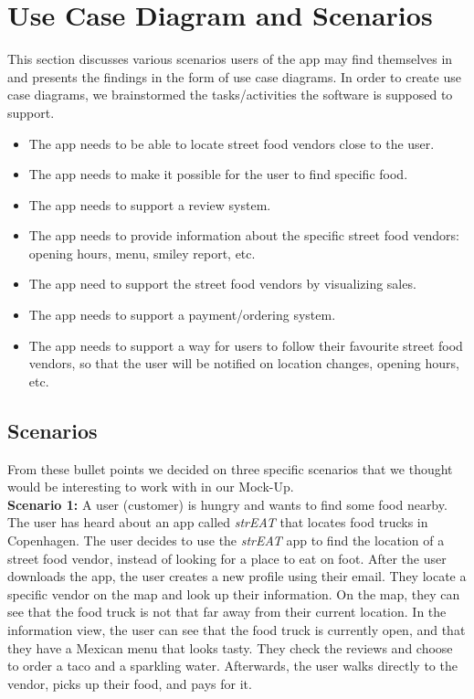 \section{Use Case Diagram and Scenarios}

This section discusses various scenarios users of the app may find themselves in and presents the findings in the form of use case diagrams. In order to create use case diagrams, we brainstormed the tasks/activities the software is supposed to support.

\begin{itemize}
\item The app needs to be able to locate street food vendors close to the user.
\item The app needs to make it possible for the user to find specific food.
\item The app needs to support a review system.
\item The app needs to provide information about the specific street food vendors: opening hours, menu, smiley report, etc.
\item The app need to support the street food vendors by visualizing sales.
\item The app needs to support a payment/ordering system.
\item The app needs to support a way for users to follow their favourite street food vendors, so that the user will be notified on location changes, opening hours, etc.
\end{itemize}


\subsection{Scenarios}
From these bullet points we decided on three specific scenarios that we thought would be interesting to work with in our Mock-Up.\\

\textbf{Scenario 1:}
A user (customer) is hungry and wants to find some food nearby. The user has heard about an app called \textit{strEAT} that locates food trucks in Copenhagen. The user decides to use the \textit{strEAT} app to find the location of a street food vendor, instead of looking for a place to eat on foot. After the user downloads the app, the user creates a new profile using their email. They locate a specific vendor on the map and look up their information. On the map, they can see that the food truck is not that far away from their current location. In the information view, the user can see that the food truck is currently open, and that they have a Mexican menu that looks tasty. They check the reviews and choose to order a taco and a sparkling water. Afterwards, the user walks directly to the vendor, picks up their food, and pays for it.
\\

